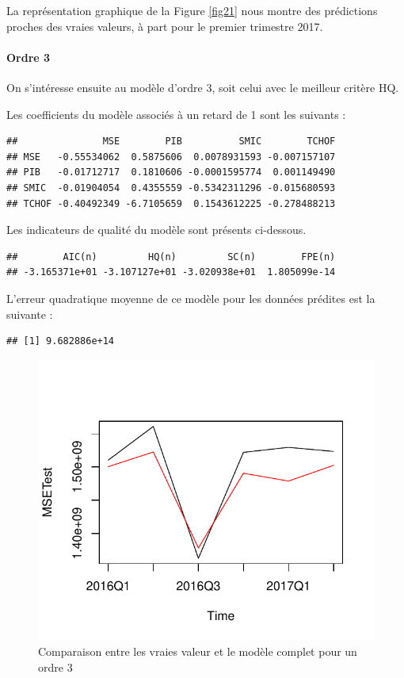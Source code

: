 \documentclass[11pt,]{article}
\let\oldparagraph\paragraph
\renewcommand{\paragraph}[1]{\oldparagraph{#1}\mbox{}}
\begin{document}
La représentation graphique de la Figure \ref{fig21} nous montre des
prédictions proches des vraies valeurs, à part pour le premier trimestre
2017.

\paragraph{Ordre 3}\label{ordre-3}

On s'intéresse ensuite au modèle d'ordre 3, soit celui avec le meilleur
critère HQ.

Les coefficients du modèle associés à un retard de 1 sont les suivants :

\begin{verbatim}
##               MSE        PIB          SMIC        TCHOF
## MSE   -0.55534062  0.5875606  0.0078931593 -0.007157107
## PIB   -0.01712717  0.1810606 -0.0001595774  0.001149490
## SMIC  -0.01904054  0.4355559 -0.5342311296 -0.015680593
## TCHOF -0.40492349 -6.7105659  0.1543612225 -0.278488213
\end{verbatim}

Les indicateurs de qualité du modèle sont présents ci-dessous.

\begin{verbatim}
##        AIC(n)         HQ(n)         SC(n)        FPE(n) 
## -3.165371e+01 -3.107127e+01 -3.020938e+01  1.805099e-14
\end{verbatim}

L'erreur quadratique moyenne de ce modèle pour les données prédites est
la suivante :

\begin{verbatim}
## [1] 9.682886e+14
\end{verbatim}

\begin{figure}[htbp]
\centering
\includegraphics{Rapport_final_files/figure-latex/unnamed-chunk-33-1.pdf}
\caption{\label{fig22} Comparaison entre les vraies valeur et le modèle
complet pour un ordre 3}
\end{figure}
\end{document}
